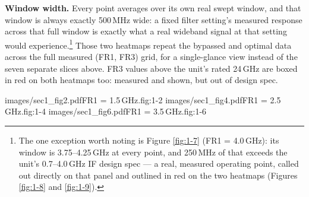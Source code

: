 \textbf{Window width.} Every point averages over its own real swept window, and that window is always exactly
500\,MHz wide: a fixed filter setting's measured response across that full window is exactly what a real
wideband signal at that setting would experience.\footnote{The one exception worth noting is Figure
\ref{fig:1-7} (FR1 = 4.0\,GHz): its window is 3.75--4.25\,GHz at every point, and 250\,MHz of that exceeds the
unit's 0.7--4.0\,GHz IF design spec --- a real, measured operating point, called out directly on that panel
and outlined in red on the two heatmaps (Figures \ref{fig:1-8} and \ref{fig:1-9}).} Those two heatmaps repeat
the bypassed and optimal data across the full measured (FR1, FR3) grid, for a single-glance view instead of the seven separate slices above. FR3 values above the unit's rated 24\,GHz are boxed in red on both heatmaps
too: measured and shown, but out of design spec.

%
        {images/sec1_fig2.pdf}{FR1 = 1.5\,GHz.}{fig:1-2}
%
        {images/sec1_fig4.pdf}{FR1 = 2.5\,GHz.}{fig:1-4}
%
        {images/sec1_fig6.pdf}{FR1 = 3.5\,GHz.}{fig:1-6}
